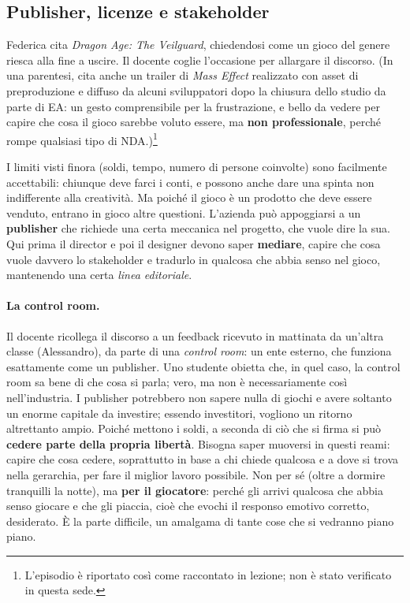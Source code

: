 \subsection{Publisher, licenze e stakeholder}

Federica cita \emph{Dragon Age: The Veilguard}, chiedendosi come un gioco del
genere riesca alla fine a uscire. Il docente coglie l'occasione per allargare
il discorso. (In una parentesi, cita anche un trailer di \emph{Mass Effect}
realizzato con asset di preproduzione e diffuso da alcuni sviluppatori dopo
la chiusura dello studio da parte di EA: un gesto comprensibile per la
frustrazione, e bello da vedere per capire che cosa il gioco sarebbe voluto
essere, ma \textbf{non professionale}, perché rompe qualsiasi tipo di
NDA.)\footnote{L'episodio è riportato così come raccontato in lezione; non è
stato verificato in questa sede.}

I limiti visti finora (soldi, tempo, numero di persone coinvolte) sono
facilmente accettabili: chiunque deve farci i conti, e possono anche dare una
spinta non indifferente alla creatività. Ma poiché il gioco è un prodotto che
deve essere venduto, entrano in gioco altre questioni. L'azienda può
appoggiarsi a un \textbf{publisher} che richiede una certa meccanica nel
progetto, che vuole dire la sua. Qui prima il director e poi il designer
devono saper \textbf{mediare}, capire che cosa vuole davvero lo stakeholder e
tradurlo in qualcosa che abbia senso nel gioco, mantenendo una certa
\emph{linea editoriale}.

\paragraph{La control room.} Il docente ricollega il discorso a un feedback
ricevuto in mattinata da un'altra classe (Alessandro), da parte di una
\emph{control room}: un ente esterno, che funziona esattamente come un
publisher. Uno studente obietta che, in quel caso, la control room sa bene di
che cosa si parla; vero, ma non è necessariamente così nell'industria. I
publisher potrebbero non sapere nulla di giochi e avere soltanto un enorme
capitale da investire; essendo investitori, vogliono un ritorno altrettanto
ampio. Poiché mettono i soldi, a seconda di ciò che si firma si può
\textbf{cedere parte della propria libertà}. Bisogna saper muoversi in questi
reami: capire che cosa cedere, soprattutto in base a chi chiede qualcosa e a
dove si trova nella gerarchia, per fare il miglior lavoro possibile. Non per
sé (oltre a dormire tranquilli la notte), ma \textbf{per il giocatore}: perché
gli arrivi qualcosa che abbia senso giocare e che gli piaccia, cioè che
evochi il responso emotivo corretto, desiderato. È la parte difficile, un
amalgama di tante cose che si vedranno piano piano.

